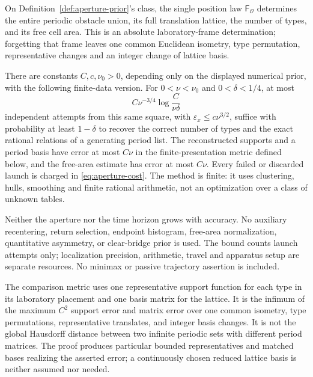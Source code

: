 \begin{theorem}
\label{thm:aperture-main}
On Definition~\ref{def:aperture-prior}'s class, the single position law
$\mathsf F_{\mathcal O}$ determines the entire periodic obstacle union,
its full translation lattice, the number of types, and its free cell area.
This is an absolute laboratory-frame determination; forgetting that frame
leaves one common Euclidean isometry, type permutation, representative
changes and an integer change of lattice basis.

There are constants $C,c,\nu_0>0$, depending only on the displayed
numerical prior, with the following finite-data version. For
$0<\nu<\nu_0$ and $0<\delta<1/4$, at most
\begin{equation}\label{eq:aperture-cost}
 C\nu^{-3/4}\log\frac{C}{\nu\delta}
\end{equation}
independent attempts from this same square, with
$\varepsilon_x\le c\nu^{3/2}$, suffice with probability at least
$1-\delta$ to recover the correct number of types and the exact rational
relations of a generating period list. The reconstructed supports and
a period basis have error at most $C\nu$ in the finite-presentation
metric defined below, and the free-area estimate has error at most $C\nu$.
Every failed or discarded launch is charged in \eqref{eq:aperture-cost}.
The method is finite: it uses clustering, hulls, smoothing and finite
rational arithmetic, not an optimization over a class of unknown tables.

Neither the aperture nor the time horizon grows with accuracy. No
auxiliary recentering, return selection, endpoint histogram, free-area
normalization, quantitative asymmetry, or clear-bridge prior is used.
The bound counts launch attempts only; localization precision, arithmetic,
travel and apparatus setup are separate resources. No minimax or passive
trajectory assertion is included.
\end{theorem}

The comparison metric uses one representative support function for each
type in its laboratory placement and one basis matrix for the lattice.
It is the infimum of the maximum $C^2$ support error and matrix error
over one common isometry, type permutations, representative translates,
and integer basis changes. It is not the global Hausdorff distance between
two infinite periodic sets with different period matrices. The proof
produces particular bounded representatives and matched bases realizing
the asserted error; a continuously chosen reduced lattice basis is neither
assumed nor needed.

